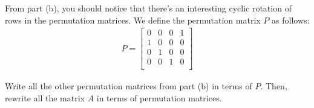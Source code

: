 \begin{enumerate}

\qitem
From part (b), you should notice that there's an interesting cyclic rotation of rows in the permutation matrices.
We define the permutation matrix $P$ as follows:
\begin{align*}
P =
\begin{bmatrix}
0 & 0 & 0 & 1\\
1 & 0 & 0 & 0\\
0 & 1 & 0 & 0\\
0 & 0 & 1 & 0\\
\end{bmatrix}
\end{align*}

Write all the other permutation matrices from part (b) in terms of $P$.
Then, rewrite all the matrix $A$ in terms of permutation matrices.

\end{enumerate}
